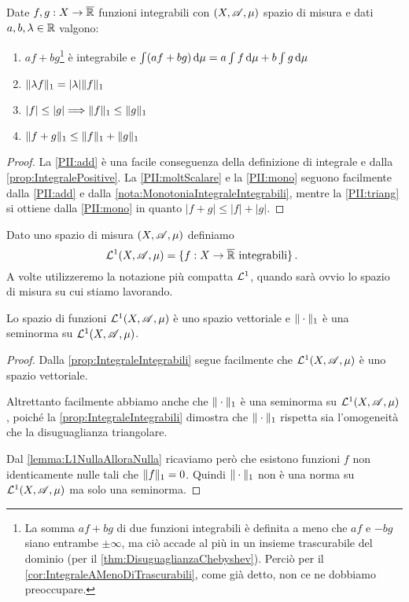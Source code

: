 \begin{proposition}\label{prop:IntegraleIntegrabili}
	Date $f,g:X\to\overline{\mathbb R}$ funzioni integrabili con $(X,\mathscr A,\mu)$ spazio di misura e dati $a,b,\lambda\in\mathbb R$ valgono:
	\begin{enumerate}
		\item $af+bg$\footnote{La somma $af+bg$ di due funzioni integrabili è definita a meno che $af$ e $-bg$ siano entrambe $\pm \infty$, ma ciò accade al più in un insieme trascurabile del dominio (per il \cref{thm:DisuguaglianzaChebyshev}). Perciò per il \cref{cor:IntegraleAMenoDiTrascurabili}, come già detto, non ce ne dobbiamo preoccupare. } è integrabile e $\int (af+bg)\,\mathrm d\mu=a\int f\,\mathrm d\mu+b\int g\,\mathrm d\mu$ \label{PII:add}
		\item $\Vert \lambda f\Vert_1=|\lambda|\Vert f\Vert_1$ \label{PII:moltScalare}
		\item $|f|\le |g|\Longrightarrow \Vert f\Vert_1\le \Vert g\Vert_1$ \label{PII:mono}
		\item $\Vert f+g\Vert_1\le\Vert f\Vert_1+\Vert g\Vert_1$ \label{PII:triang}
	\end{enumerate}
\end{proposition}
\begin{proof}
	La \ref{PII:add} è una facile conseguenza della definizione di integrale e dalla \cref{prop:IntegralePositive}.
	La \ref{PII:moltScalare} e la \ref{PII:mono} seguono facilmente dalla \ref{PII:add} e dalla \cref{nota:MonotoniaIntegraleIntegrabili}, mentre la \ref{PII:triang} si ottiene dalla \ref{PII:mono} in quanto $|f+g|\le|f|+|g|$.
\end{proof}



\begin{definition}
	Dato uno spazio di misura $(X,\mathscr A,\mu)$ definiamo
	\begin{equation*}
		\mathcal L^1(X,\mathscr A,\mu)=\{ f:X\to\overline{\mathbb R} \text{ integrabili} \}\, \text{. }
	\end{equation*}
	A volte utilizzeremo la notazione più compatta $\mathcal L^1$, quando sarà ovvio lo spazio di misura su cui stiamo lavorando.
\end{definition}


\begin{proposition}\label{prop:L1VettorialeConSeminorma}
	Lo spazio di funzioni $\mathcal L^1(X,\mathscr A,\mu)$ è uno spazio vettoriale e $\Vert \cdot\Vert_1$ è una seminorma su $\mathcal L^1(X,\mathscr A,\mu)$.
\end{proposition}
\begin{proof}
	Dalla \cref{prop:IntegraleIntegrabili} segue facilmente che $\mathcal L^1(X,\mathscr A,\mu)$ è uno spazio vettoriale. 
	
	Altrettanto facilmente abbiamo anche che $\Vert \cdot\Vert_1$ è una seminorma su $\mathcal L^1(X,\mathscr A,\mu)$, poiché la \cref{prop:IntegraleIntegrabili} dimostra che $\Vert \cdot\Vert_1$ rispetta sia l'omogeneità che la disuguaglianza triangolare.
	
	Dal \cref{lemma:L1NullaAlloraNulla} ricaviamo però che esistono funzioni $f$ non identicamente nulle tali che $\Vert f\Vert_1=0$. Quindi $\Vert \cdot\Vert_1$ non è una norma su $\mathcal L^1(X,\mathscr A,\mu)$ ma solo una seminorma.
\end{proof}

